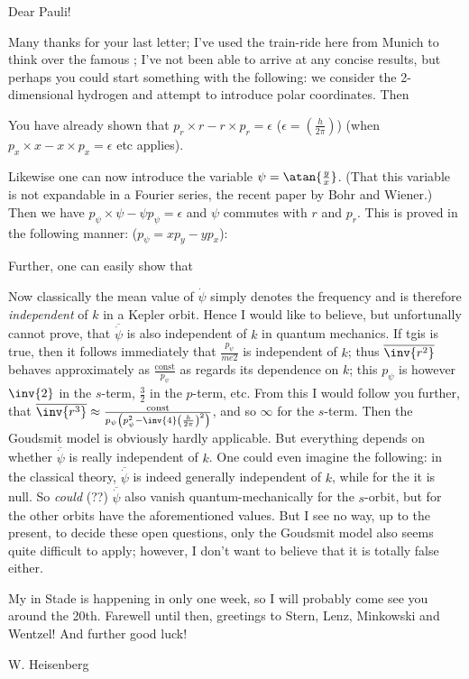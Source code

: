 \date{January 7, 1926}

Dear Pauli!

Many thanks for your last letter; I've used the train-ride here from Munich to think over the famous ; I've not been able to arrive at any concise results, but perhaps you could start something with the following: we consider the 2-dimensional hydrogen and attempt to introduce polar coordinates. Then

You have already shown that $p_r \times r - r\times p_r = \epsilon$ ($\epsilon=\left(\frac{h}{2\pi}\right)$) (when $p_x \times x - x\times p_x = \epsilon$ etc applies).

Likewise one can now introduce the variable $\psi = \atan{\frac{y}{x}}$. (That this variable is not expandable in a Fourier series,  the recent paper by Bohr and Wiener.) Then we have $p_\psi \times \psi - \psi p_\psi = \epsilon$ and $\psi$ commutes with $r$ and $p_r$. This is proved in the following manner: ($p_\psi = x p_y - y p_x$):

Further, one can easily show that

Now classically the mean value of $\dot{\psi}$ simply denotes the frequency and is therefore \textit{independent} of $k$ in a Kepler orbit. Hence I would like to believe, but unfortunally cannot prove, that $\overline{\dot{\psi}}$ is also independent of $k$ in quantum mechanics. If tgis is true, then it follows immediately that $\frac{p_\psi}{me2}$ is independent of $k$; thus $\overline{\inv{r^2}}$ behaves approximately as $\frac{\text{const}}{p_\psi}$ as regards its dependence on $k$; this $p_\psi$ is however $\inv{2}$ in the $s$-term, $\frac{3}{2}$ in the $p$-term, etc. From this I would follow you further, that $\overline{\inv{r^3}} \approx \frac{\text{const}}{p_\psi\left(p_\psi^2 - \inv{4}\left(\frac{h}{2\pi}\right)^2\right)}$, and so $\infty$ for the $s$-term. Then the Goudsmit model is obviously hardly applicable. But everything depends on whether $\overline{\dot{\psi}}$ is really independent of $k$. One could even imagine the following: in the classical theory, $\overline{\dot{\psi}}$ is indeed generally independent of $k$, while for the  it is null. So \textit{could} (??) $\overline{\dot{\psi}}$ also vanish quantum-mechanically for the $s$-orbit, but for the other orbits have the aforementioned values. But I see no way, up to the present, to decide these open questions, only the Goudsmit model also seems quite difficult to apply; however, I don't want to believe that it is totally false either.

My  in Stade is happening in only one week, so I will probably come see you around the 20th. Farewell until then, greetings to Stern, Lenz, Minkowski and Wentzel! And further good luck!

W. Heisenberg
